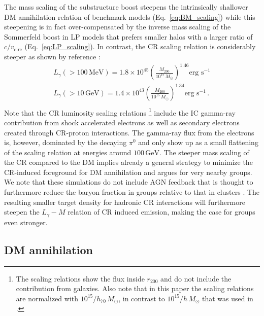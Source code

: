 \documentclass[10pt,aps,pra,reprint,amsmath,amsfonts,amssymb,showpacs,nofootinbib,floatfix]{revtex4-1}
\newcommand{\rmn}{\mathrm}
\newcommand{\msun}{M_\odot}
\newcommand{\mev}{\rmn{MeV}}
\newcommand{\gev}{\rmn{GeV}}
\newcommand{\rvir}{r_{200}}
\newcommand{\mvir}{M_{200}}
\begin{document}
The mass scaling of the substructure
boost steepens the intrinsically shallower DM annihilation relation of
benchmark models (Eq.~\ref{eq:BM_scaling}) while this steepening is in
fact over-compensated by the inverse mass scaling of the Sommerfeld
boost in LP models that prefers smaller halos with a larger ratio of
$c/v_\mathrm{circ}$ (Eq.~\ref{eq:LP_scaling}). In contrast, the CR
scaling relation is considerably steeper as shown by reference
\cite{2010MNRAS.409..449P}:
\begin{eqnarray}
L_{\gamma}(>100\,\mev) = 1.8\times10^{45}
\left(\frac{\mvir}{10^{15}\,\msun}\right)^{1.46}\mbox{erg~s}^{-1}\nonumber\\
L_{\gamma}(>10\,\gev)  = 1.4\times10^{43}
\left(\frac{\mvir}{10^{15}\,\msun}\right)^{1.34}\mbox{erg~s}^{-1}\,.\nonumber\\
\end{eqnarray}
Note that the CR luminosity scaling relations \footnote{The scaling
  relations show the flux inside $\rvir$ and do not include the
  contribution from galaxies. Also note that in this paper the scaling
  relations are normalized with $10^{15}/h_{70}\,\msun$, in contrast
  to $10^{15}/h\,\msun$ that was used in \cite{2010MNRAS.409..449P}.}
include the IC gamma-ray contribution from shock accelerated electrons
as well as secondary electrons created through CR-proton
interactions. The gamma-ray flux from the electrons is, however,
dominated by the decaying $\pi^0$ and only show up as a small
flattening of the scaling relation at energies around $100\,\gev$. The
steeper mass scaling of the CR compared to the DM implies already a
general strategy to minimize the CR-induced foreground for DM
annihilation and argues for very nearby groups. We note that these
simulations do not include AGN feedback that is thought to furthermore
reduce the baryon fraction in groups relative to that in clusters
\cite{2008ApJ...687L..53P}. The resulting smaller target density for
hadronic CR interactions will furthermore steepen the $L_\gamma-M$
relation of CR induced emission, making the case for groups even
stronger.

\subsection{DM annihilation}
\end{document}
